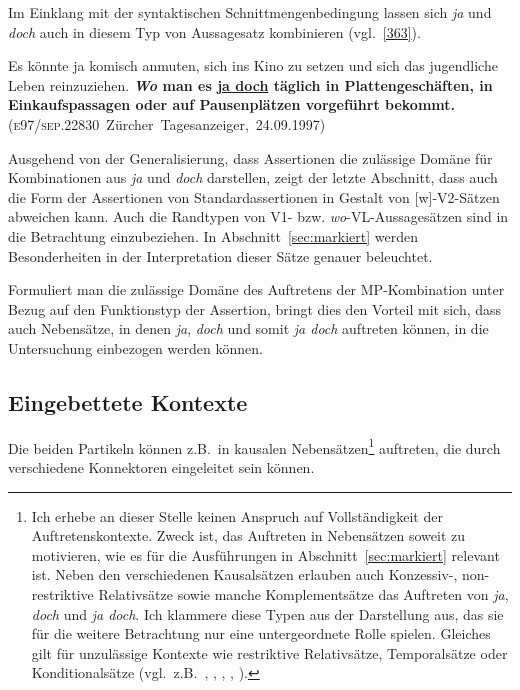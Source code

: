 Im Einklang mit der syntaktischen Schnittmengenbedingung lassen sich \textit{ja} und \textit{doch} auch in diesem Typ von Aussagesatz kombinieren (vgl.\ \ref{363}).

\begin{exe}
	\ex\label{363} 

	Es könnte ja komisch anmuten, sich ins Kino zu setzen und sich das jugendliche Leben reinzuziehen. \textbf{\textit{Wo} man es \underline{ja doch} 			täglich in Plattengeschäften, in Einkaufspassagen oder auf Pausenplätzen vorgeführt bekommt.}
	\newline\hbox{}\hfill\hbox{(\textsc{e97/sep.22830} Zürcher Tagesanzeiger, 24.09.1997)}	
\end{exe}
Ausgehend von der Generalisierung, dass Assertionen die zulässige Domäne für Kombinationen aus \textit{ja} und \textit{doch} darstellen, zeigt der letzte Abschnitt, dass auch die Form der Assertionen von Standardassertionen in Gestalt von [\textminus w]-V2-Sät\-zen abweichen kann. Auch die Randtypen von V1- bzw. \textit{wo}-VL-Aussagesätzen sind in die Betrachtung einzubeziehen. In Abschnitt~\ref{sec:markiert} werden Besonderheiten in der Interpretation dieser Sätze genauer beleuchtet. 

Formuliert man die zulässige Domäne des Auftretens der MP-Kombination unter Bezug auf den Funktionstyp der Assertion, bringt dies den Vorteil mit sich, dass auch Nebensätze, in denen \textit{ja}, \textit{doch} und somit \textit{ja doch} auftreten können, in die Untersuchung einbezogen werden können. 

\subsection{Eingebettete Kontexte}
\label{sec:eingkon}
Die beiden Partikeln können z.B.\ in kausalen Nebensätzen\footnote{Ich erhebe an dieser Stelle keinen Anspruch auf Vollständigkeit der Auftretenskontexte. Zweck ist, das Auftreten in Nebensätzen soweit zu motivieren, wie es für die Ausführungen in Abschnitt~\ref{sec:markiert} relevant ist. Neben den verschiedenen Kausalsätzen erlauben auch Konzessiv-, non-restriktive Relativsätze sowie manche Komplementsätze das Auftreten von \textit{ja}, \textit{doch} und \textit{ja doch}. Ich klammere diese Typen aus der Darstellung aus, das sie für die weitere Betrachtung nur eine untergeordnete Rolle spielen. Gleiches gilt für unzulässige Kontexte wie restriktive Re\-lativsätze, Temporalsätze oder Konditionalsätze (vgl.\ z.B.\ \citealt[11]{Borst1985}, \citealt[76]{Thurmair1989} \citealt[166]{Helbig1994}, \citealt[115]{Coniglio2007}, \citealt[139/152/147/152]{Coniglio2011}, \citealt[59]{Frey2011}).} auftreten, die durch verschiedene Konnektoren eingeleitet sein können.

